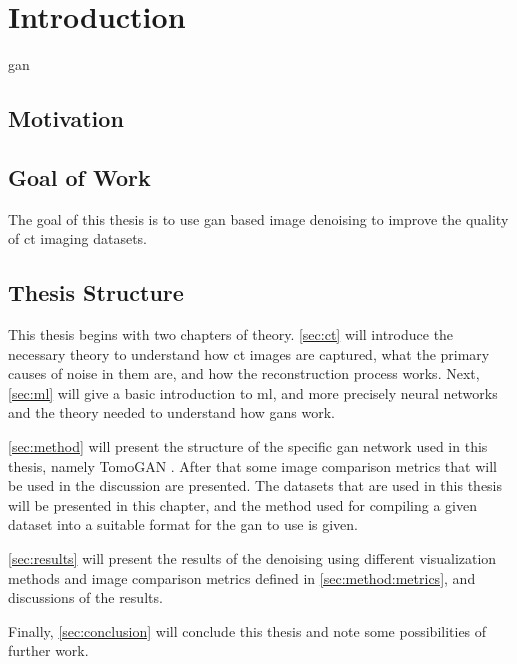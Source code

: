 \chapter{Introduction}
\label{sec:introduction}
\todo[inline]{}
\acrfull{gan}

\section{Motivation}


\section{Goal of Work}
\todo[inline]{}
The goal of this thesis is to use \acrshort{gan} based image denoising to improve the quality of \acrshort{ct} imaging datasets. 

\section{Thesis Structure}
This thesis begins with two chapters of theory. \cref{sec:ct} will introduce the necessary theory to understand how \acrshort{ct} images are captured, what the primary causes of noise in them are, and how the reconstruction process works. Next, \cref{sec:ml} will give a basic introduction to \acrfull{ml}, and more precisely neural networks and the theory needed to understand how \acrshort{gan}s work. 

\cref{sec:method} will present the structure of the specific \acrshort{gan} network used in this thesis, namely TomoGAN \cite{liu2020tomogan}. After that some image comparison metrics that will be used in the discussion are presented. The datasets that are used in this thesis will be presented in this chapter, and the method used for compiling a given dataset into a suitable format for the \acrshort{gan} to use is given. 

\cref{sec:results} will present the results of the denoising using different visualization methods and image comparison metrics defined in \cref{sec:method:metrics}, and discussions of the results. 

Finally, \cref{sec:conclusion} will conclude this thesis and note some possibilities of further work. 